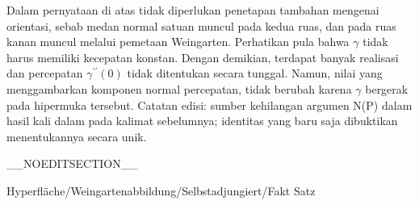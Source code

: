 Dalam pernyataan di atas tidak diperlukan penetapan tambahan mengenai orientasi, sebab medan normal satuan muncul pada kedua ruas, dan pada ruas kanan muncul melalui pemetaan Weingarten. Perhatikan pula bahwa $\gamma$ tidak harus memiliki kecepatan konstan. Dengan demikian, terdapat banyak realisasi dan percepatan $\gamma^{\prime \prime} (0)$ tidak ditentukan secara tunggal. Namun, nilai
 yang menggambarkan komponen normal percepatan, tidak berubah karena $\gamma$ bergerak pada hipermuka tersebut.
Catatan edisi: sumber kehilangan argumen N(P) dalam hasil kali dalam pada kalimat sebelumnya; identitas yang baru saja dibuktikan menentukannya secara unik.

__NOEDITSECTION__

{Hyperfläche/Weingartenabbildung/Selbstadjungiert/Fakt}
{Satz}
{}
{

\faktzusatz {}
\faktzusatz {}

}
